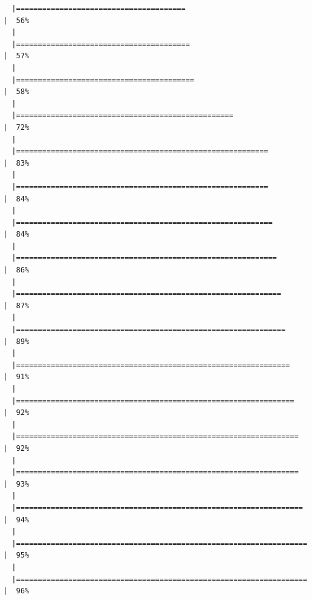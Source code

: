 \documentclass[
  letterpaper,
  DIV=11,
  numbers=noendperiod]{scrreprt}
\begin{document}
\begin{verbatim}
  |=======================================                               |  56%
  |                                                                            
  |========================================                              |  57%
  |                                                                            
  |=========================================                             |  58%
  |                                                                            
  |==================================================                    |  72%
  |                                                                            
  |==========================================================            |  83%
  |                                                                            
  |==========================================================            |  84%
  |                                                                            
  |===========================================================           |  84%
  |                                                                            
  |============================================================          |  86%
  |                                                                            
  |=============================================================         |  87%
  |                                                                            
  |==============================================================        |  89%
  |                                                                            
  |===============================================================       |  91%
  |                                                                            
  |================================================================      |  92%
  |                                                                            
  |=================================================================     |  92%
  |                                                                            
  |=================================================================     |  93%
  |                                                                            
  |==================================================================    |  94%
  |                                                                            
  |===================================================================   |  95%
  |                                                                            
  |===================================================================   |  96%

\end{verbatim}
\end{document}
